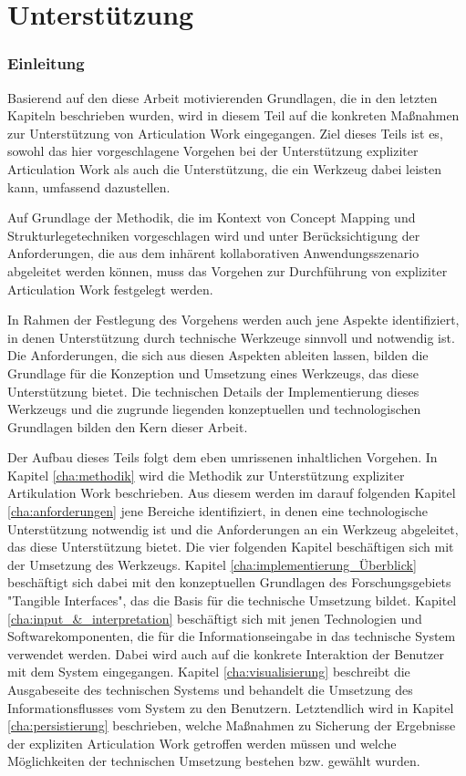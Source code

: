 \part{Unterstützung} %
\label{prt:umsetzung}

\section*{Einleitung} %
\label{sec:umsetzung_einleitung}
\thispagestyle{empty}

Basierend auf den diese Arbeit motivierenden Grundlagen, die in den letzten Kapiteln beschrieben wurden, wird in diesem Teil auf die konkreten Maßnahmen zur Unterstützung von Articulation Work eingegangen. Ziel dieses Teils ist es, sowohl das hier vorgeschlagene Vorgehen bei der Unterstützung expliziter Articulation Work als auch die Unterstützung, die ein Werkzeug dabei leisten kann, umfassend dazustellen.

Auf Grundlage der Methodik, die im Kontext von Concept Mapping und Strukturlegetechniken vorgeschlagen wird und unter Berücksichtigung der Anforderungen, die aus dem inhärent kollaborativen Anwendungsszenario abgeleitet werden können, muss das Vorgehen zur Durchführung von expliziter Articulation Work festgelegt werden. 

In Rahmen der Festlegung des Vorgehens werden auch jene Aspekte identifiziert, in denen Unterstützung durch technische Werkzeuge sinnvoll und notwendig ist. Die Anforderungen, die sich aus diesen Aspekten ableiten lassen, bilden die Grundlage für die Konzeption und Umsetzung eines Werkzeugs, das diese Unterstützung bietet. Die technischen Details der Implementierung dieses Werkzeugs und die zugrunde liegenden konzeptuellen und technologischen Grundlagen bilden den Kern dieser Arbeit.

Der Aufbau dieses Teils folgt dem eben umrissenen inhaltlichen Vorgehen. In Kapitel \ref{cha:methodik} wird die Methodik zur Unterstützung expliziter Artikulation Work beschrieben. Aus diesem werden im darauf folgenden Kapitel \ref{cha:anforderungen} jene Bereiche identifiziert, in denen eine technologische Unterstützung notwendig ist und die Anforderungen an ein Werkzeug abgeleitet, das diese Unterstützung bietet. Die vier folgenden Kapitel beschäftigen sich mit der Umsetzung des Werkzeugs. Kapitel \ref{cha:implementierung_Überblick} beschäftigt sich dabei mit den konzeptuellen Grundlagen des Forschungsgebiets "Tangible Interfaces", das die Basis für die technische Umsetzung bildet. Kapitel \ref{cha:input_&_interpretation} beschäftigt sich mit jenen Technologien und Softwarekomponenten, die für die Informationseingabe in das technische System verwendet werden. Dabei wird auch auf die konkrete Interaktion der Benutzer mit dem System eingegangen. Kapitel \ref{cha:visualisierung} beschreibt die Ausgabeseite des technischen Systems und behandelt die Umsetzung des Informationsflusses vom System zu den Benutzern. Letztendlich wird in Kapitel \ref{cha:persistierung} beschrieben, welche Maßnahmen zu Sicherung der Ergebnisse der expliziten Articulation Work getroffen werden müssen und welche Möglichkeiten der technischen Umsetzung bestehen bzw. gewählt wurden.

